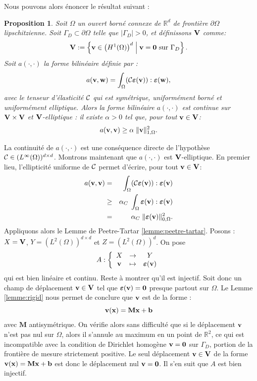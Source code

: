 \documentclass[11pt]{book}
\newtheorem{proposition}[theorem]{Proposition}
\newcommand{\beqs}{\begin{eqnarray*}}
\newcommand{\eeqs}{\end{eqnarray*}}
\newcommand{\bp}{\begin{proposition}}
\newcommand{\ep}{\end{proposition}}
\def\vv{{\bf v}}
\def\w{{\bf w}}
\def\x{{\bf x}}
\def\V{{\bf V}}
\def\0{{\bf 0}}
\def\G{{\Gamma}}
\newcommand{\caC}{{\cal C}}
\newcommand{\R}{\mathbb{R}}
\newcommand{\e}{\mbox{\boldmath{$\varepsilon$}}}
\begin{document}
Nous pouvons alors énoncer le résultat suivant :
 
 \bp
 \label{prop:coercivite}
Soit $\Omega$ un ouvert borné connexe de $\R^d$ de frontière $\partial \Omega$ lipschitzienne. Soit $\Gamma_D \subset \partial \Omega$ telle que $|\Gamma_D | > 0$, et définissons $\V$ comme:
 \[
 \V :=\left\{\vv\in \left(H^1(\Omega)\right)^d \; \middle| \; \vv=\0 \hbox{ sur }\Gamma_D\right\}.
 \]
Soit $a(\cdot,\cdot)$ la forme bilin\'eaire d\'efinie par :
 \[
 a(\vv,\w) = 
 \int_{\Omega} ({\caC} \e(\vv)) : \e(\w), %
 \]
avec le tenseur d'élasticité ${\caC}$ qui est symétrique, uniformément borné et uniformément elliptique.
Alors la forme bilinéaire $a(\cdot,\cdot)$ est continue sur $\V \times \V$ et $\V$-elliptique : il existe $\alpha > 0$ tel que, pour tout $\vv \in \V$:
 \[
 a(\vv,\vv) \geq \alpha \; \| \vv \|^2_{1,\Omega}.
 \]
\ep
 \proof
La continuité de $a(\cdot,\cdot)$ est une conséquence directe de l'hypothèse
 ${\caC} \in (L^\infty (\Omega))^{d\times d}$. %
Montrons maintenant que $a(\cdot,\cdot)$ est $\V$-elliptique. En premier lieu, 
l'ellipticit\'e uniforme de ${\caC}$ %
permet d'\'ecrire, pour tout $\vv \in \V$:
 \beqs
 a(\vv,\vv) &=& 
 \;\int_{\Omega} ({\caC} \e(\vv)) : \e(\vv) \\ %
 &\geq& \alpha_C
 \;\int_{\Omega} \e(\vv) : \e(\vv) \\ %
 &= & \alpha_C \;
 \| \e(\vv) \|_{0,\Omega}^2.
 \eeqs
Appliquons alors le Lemme de Peetre-Tartar
 \ref{lemme:peetre-tartar}. Posons :
 $X = \V$, $Y = (L^2(\Omega))^{d\times d}$ et $Z=(L^2(\Omega))^d$. %
On pose
 \[
 A :
 \left \{
 \begin{array}{ccc}
 X & \rightarrow &
 Y\\
 \vv & \mapsto & \e(\vv)
\end{array}
 \right. 
 \]
qui est bien lin\'eaire et continu. Reste \`a montrer qu'il est injectif.
 Soit donc un champ de d\'eplacement $\vv \in \V$ tel que $\e(\vv) = \0$ presque partout sur $\Omega$.
 Le Lemme \ref{lemme:rigid} nous permet de conclure que $\vv$ est de la forme :
\[
\vv(\x) = \mathbf{M} \x + \mathbf{b}
\]
avec $\mathbf{M}$ antisym\'etrique.
On v\'erifie alors sans difficult\'e que si le d\'eplacement $\vv$ n'est pas nul sur $\Omega$, alors
il s'annule au maximum en un point de $\R^2$, ce qui est incompatible avec la condition de Dirichlet
homog\`ene $\vv=\0$ sur $\G_D$, portion de la fronti\`ere de mesure strictement positive. Le seul
d\'eplacement $\vv \in \V$ de la forme $\vv(\x) = \mathbf{M} \x + \mathbf{b}$ est donc le d\'eplacement nul $\vv = \0$.
Il s'en suit que $A$ est bien injectif.
\end{document}
